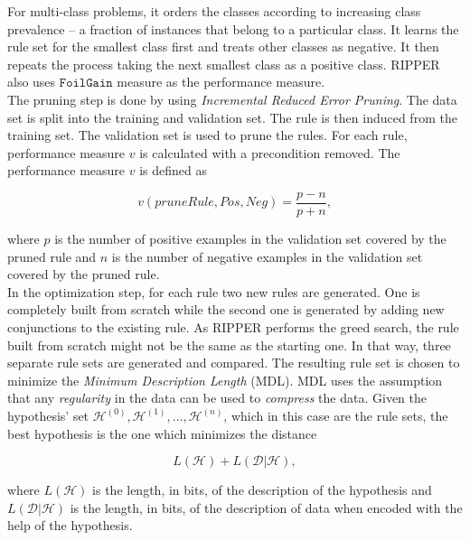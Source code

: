 For multi-class problems, it orders the classes according to increasing class prevalence --  a fraction of instances that belong to a particular class. It learns the rule set for the smallest class first and treats other classes as negative. It then repeats the process taking the next smallest class as a positive class. RIPPER also uses $\mathtt{FoilGain}$ measure as the performance measure.\\

The pruning step is done by using \textit{Incremental Reduced Error Pruning}. The data set is split into the training and validation set. The rule is then induced from the training set. The validation set is used to prune the rules. For each rule, performance measure $v$ is calculated with a precondition removed. The performance measure $v$ is defined as 

\begin{equation}
	v(pruneRule, Pos, Neg) = \frac{p - n}{p + n},
\end{equation}

where $p$ is the number of positive examples in the validation set covered by the pruned rule and $n$ is the number of negative examples in the validation set covered by the pruned rule. \\

In the optimization step, for each rule two new rules are generated. One is completely built from scratch while the second one is generated by adding new conjunctions to the existing rule. As RIPPER performs the greed search, the rule built from scratch might not be the same as the starting one. In that way, three separate rule sets are generated and compared. The resulting rule set is chosen to minimize the \textit{Minimum Description Length} (MDL). MDL uses the assumption that any \textit{regularity} in the data can be used to \textit{compress} the data. Given the hypothesis' set $\mathcal{H}^{(0)}, \mathcal{H}^{(1)}, \ldots, \mathcal{H}^{(n)}$, which in this case are the rule sets, the best hypothesis is the one which minimizes the distance 

\begin{equation}
	L(\mathcal{H}) + L(\mathcal{D} | \mathcal{H}),
\end{equation}

where $L(\mathcal{H})$ is the length, in bits, of the description of the hypothesis and $L(\mathcal{D} | \mathcal{H})$ is the length, in bits, of the description of data when encoded with the help of the hypothesis.


